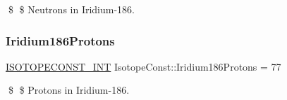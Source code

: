 \$ \$ Neutrons in Iridium-\/186. \mbox{\label{group___isotope_const-_iridium-_ir186_ga5bdaa479e9a284ca22ebcd315188dd51}} 
\subsubsection{\texorpdfstring{Iridium186\+Protons}{Iridium186Protons}}
{\footnotesize\ttfamily \mbox{\hyperlink{group___isotope_const-_macros_ga5f18360b3e99483a35c32d789e62621c}{I\+S\+O\+T\+O\+P\+E\+C\+O\+N\+S\+T\+\_\+\+I\+NT}} Isotope\+Const\+::\+Iridium186\+Protons = 77}

\$ \$ Protons in Iridium-\/186. 